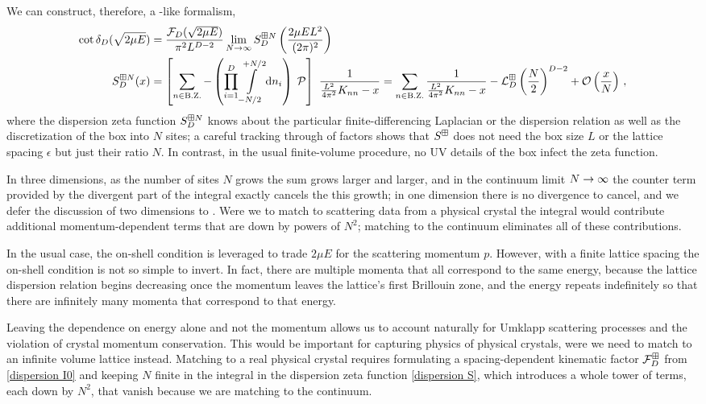 We can construct, therefore, a \Luscher-like formalism,
\begin{align}
    \label{eq:dispersion quantization}
    \cot \delta_D( \sqrt{2 \mu E} )
    &=
    \frac{\mathcal{F}_D(\sqrt{2 \mu E})}{\pi^2 L^{D-2}} \lim_{N\rightarrow\infty} S^{\boxplus N}_{D}\left(\frac{2\mu E L^2}{(2\pi)^2}\right)
    \\
    \label{eq:dispersion S}
    S^{\boxplus N}_{D}( x )
    &=
    \left[
    	\sum_{n\in\text{B.Z.}} -
		\left(\prod_{i=1}^D
    		\int\limits_{-N/2}^{+N/2}
    		\mathrm{d} n_i
    	\right)\; \mathcal{P} 
	\right]\  
	\frac{1}{ \frac{L^2}{4\pi^2}K_{nn} - x} = \sum_{n\in\text{B.Z.}}\frac{1}{ \frac{L^2}{4\pi^2}K_{nn} - x} - \mathcal{L}_D^{\boxplus}\left(\frac{N}{2}\right)^{D-2}
	+ \mathcal O\left(\frac{x}{N}\right) \, ,
\end{align}
where the dispersion zeta function $S^{\boxplus N}_{D}$ knows about the particular finite-differencing Laplacian or the dispersion relation as well as the discretization of the box into $N$ sites; a careful tracking through of factors shows that $S^{\boxplus}$ does not need the box size $L$ or the lattice spacing $\epsilon$ but just their ratio $N$.
In contrast, in the usual finite-volume procedure, no UV details of the box infect the zeta function.

In three dimensions, as the number of sites $N$ grows the sum grows larger and larger, and in the continuum limit $N\rightarrow\infty$ the counter term provided by the divergent part of the integral exactly cancels the this growth; in one dimension there is no divergence to cancel, and we defer the discussion of two dimensions to .
Were we to match to scattering data from a physical crystal the integral would contribute additional momentum-dependent terms that are down by powers of $N^2$; matching to the continuum eliminates all of these contributions.

In the usual case, the on-shell condition is leveraged to trade $2\mu E$ for the scattering momentum $p$.
However, with a finite lattice spacing the on-shell condition is not so simple to invert.
In fact, there are multiple momenta that all correspond to the same energy, because the lattice dispersion relation begins decreasing once the momentum leaves the lattice's first Brillouin zone, and the energy repeats indefinitely so that there are infinitely many momenta that correspond to that energy.

Leaving the dependence on energy alone and not the momentum allows us to account naturally for Umklapp scattering processes and the violation of crystal momentum conservation.
This would be important for capturing physics of physical crystals, were we need to match to an infinite volume lattice instead.
Matching to a real physical crystal requires formulating a spacing-dependent kinematic factor $\mathcal{F}_D^\boxplus$ from \eqref{dispersion I0} and keeping $N$ finite in the integral in the dispersion zeta function \eqref{dispersion S}, which introduces a whole tower of terms, each down by $N^2$, that vanish because we are matching to the continuum.

